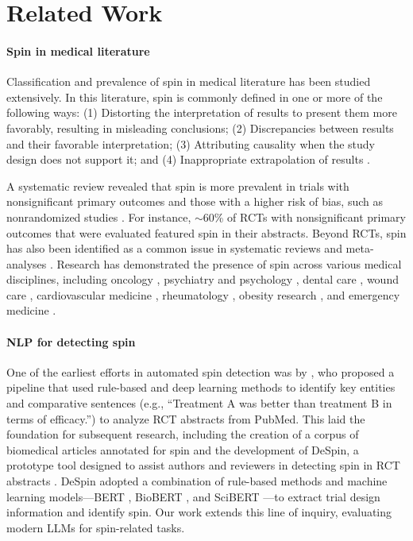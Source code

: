 \section{Related Work}
\label{section:related_work}

\paragraph{Spin in medical literature} Classification and prevalence of spin in medical literature has been studied extensively. 
In this literature, spin is commonly defined in one or more of the following ways: (1) Distorting the interpretation of results to present them more favorably, resulting in misleading conclusions; (2) Discrepancies between results and their favorable interpretation; (3) Attributing causality when the study design does not support it; and (4) Inappropriate extrapolation of results \citep{chiu2017spin}.

A systematic review revealed that spin is more prevalent in trials with nonsignificant primary outcomes and those with a higher risk of bias, such as nonrandomized studies \citep{chiu2017spin}. For instance, $\sim$60\% of RCTs with nonsignificant primary outcomes that were evaluated featured spin in their abstracts. 
Beyond RCTs, spin has also been identified as a common issue in systematic reviews and meta-analyses \citep{yavchitz2016new, nowlin2022spin, qureshi2024development}. Research has demonstrated the presence of spin across various medical disciplines, including oncology \citep{boutron2010reporting, wayant2019evaluation}, psychiatry and psychology \citep{jellison2020evaluation}, dental care \citep{su2023assessment}, wound care \citep{lockyer2013spin}, cardiovascular medicine \citep{khan2019level}, rheumatology \citep{mathieu2012misleading}, obesity research \citep{austin2019evaluation}, and emergency medicine \citep{reynolds2020evaluation}.

\paragraph{NLP for detecting spin} One of the earliest efforts in automated spin detection was by \citet{koroleva2017contribution}, who proposed a pipeline that used rule-based and deep learning methods to identify key entities and comparative sentences (e.g., ``Treatment A was better than treatment B in terms of efficacy.'') to analyze RCT abstracts from PubMed.
This laid the foundation for subsequent research, including the creation of a corpus of biomedical articles annotated for spin \citep{koroleva2018annotating} and the development of DeSpin, a prototype tool designed to assist authors and reviewers in detecting spin in RCT abstracts \citep{koroleva2020despin}. 
DeSpin adopted a combination of rule-based methods and machine learning models---BERT \citep{devlin2018bert}, BioBERT \citep{lee2020biobert}, and SciBERT \citep{beltagy2019scibert}---to extract trial design information and identify spin. 
Our work extends this line of inquiry, evaluating modern LLMs for spin-related tasks.


